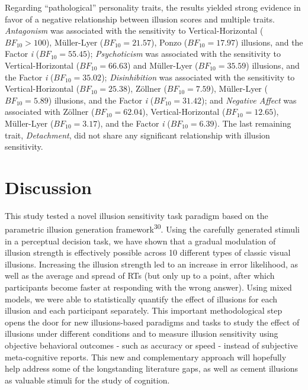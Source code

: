 \documentclass[
  man,floatsintext]{apa6}
\begin{document}
Regarding ``pathological'' personality traits, the results yielded strong evidence in favor of a negative relationship between illusion scores and multiple traits. \emph{Antagonism} was associated with the sensitivity to Vertical-Horizontal (\(BF_{10} > 100\)), Müller-Lyer (\(BF_{10} = 21.57\)), Ponzo (\(BF_{10} = 17.97\)) illusions, and the Factor \emph{i} (\(BF_{10} = 55.45\)); \emph{Psychoticism} was associated with the sensitivity to Vertical-Horizontal (\(BF_{10} = 66.63\)) and Müller-Lyer (\(BF_{10} = 35.59\)) illusions, and the Factor \emph{i} (\(BF_{10} = 35.02\)); \emph{Disinhibition} was associated with the sensitivity to Vertical-Horizontal (\(BF_{10} = 25.38\)), Zöllner (\(BF_{10} = 7.59\)), Müller-Lyer (\(BF_{10} = 5.89\)) illusions, and the Factor \emph{i} (\(BF_{10} = 31.42\)); and \emph{Negative Affect} was associated with Zöllner (\(BF_{10} = 62.04\)), Vertical-Horizontal (\(BF_{10} = 12.65\)), Müller-Lyer (\(BF_{10} = 3.17\)), and the Factor \emph{i} (\(BF_{10} = 6.39\)). The last remaining trait, \emph{Detachment}, did not share any significant relationship with illusion sensitivity.

\hypertarget{discussion}{%
\section{Discussion}\label{discussion}}

This study tested a novel illusion sensitivity task paradigm based on the parametric illusion generation framework\textsuperscript{30}. Using the carefully generated stimuli in a perceptual decision task, we have shown that a gradual modulation of illusion strength is effectively possible across 10 different types of classic visual illusions. Increasing the illusion strength led to an increase in error likelihood, as well as the average and spread of RTs (but only up to a point, after which participants become faster at responding with the wrong answer). Using mixed models, we were able to statistically quantify the effect of illusions for each illusion and each participant separately. This important methodological step opens the door for new illusions-based paradigms and tasks to study the effect of illusions under different conditions and to measure illusion sensitivity using objective behavioral outcomes - such as accuracy or speed - instead of subjective meta-cognitive reports. This new and complementary approach will hopefully help address some of the longstanding literature gaps, as well as cement illusions as valuable stimuli for the study of cognition.
\end{document}
